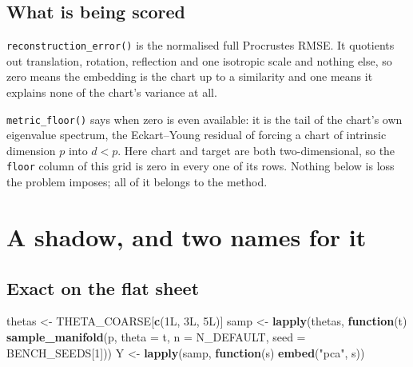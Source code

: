 \documentclass[
  british,
  a4paper,
]{book}
\newenvironment{Shaded}{\begin{snugshade}}{\end{snugshade}}
\newcommand{\AttributeTok}[1]{\textcolor[rgb]{0.13,0.29,0.53}{#1}}
\newcommand{\ControlFlowTok}[1]{\textcolor[rgb]{0.13,0.29,0.53}{\textbf{#1}}}
\newcommand{\DataTypeTok}[1]{\textcolor[rgb]{0.13,0.29,0.53}{#1}}
\newcommand{\DecValTok}[1]{\textcolor[rgb]{0.00,0.00,0.81}{#1}}
\newcommand{\FunctionTok}[1]{\textcolor[rgb]{0.13,0.29,0.53}{\textbf{#1}}}
\newcommand{\NormalTok}[1]{#1}
\newcommand{\OtherTok}[1]{\textcolor[rgb]{0.56,0.35,0.01}{#1}}
\newcommand{\StringTok}[1]{\textcolor[rgb]{0.31,0.60,0.02}{#1}}
\newcounter{none} %
\begin{document}
\subsection{What is being scored}\label{what-is-being-scored}

\texttt{reconstruction\_error()} is the normalised full Procrustes RMSE. It quotients out
translation, rotation, reflection and one isotropic scale \citep{gower1975procrustes}
and nothing else, so zero means the embedding is the chart up to a similarity and
one means it explains none of the chart's variance at all.

\texttt{metric\_floor()} says when zero is even available: it is the tail of the chart's
own eigenvalue spectrum, the Eckart--Young residual of forcing a chart of
intrinsic dimension \(p\) into \(d < p\). Here chart and target are both
two-dimensional, so the \texttt{floor} column of this grid is zero in every one of its
rows. Nothing below is loss the problem imposes; all of it belongs to the method.

\section{A shadow, and two names for it}\label{lin-core}

\subsection{Exact on the flat sheet}\label{exact-on-the-flat-sheet}

\begin{Shaded}
\begin{Highlighting}[]
\NormalTok{thetas }\OtherTok{\textless{}{-}}\NormalTok{ THETA\_COARSE[}\FunctionTok{c}\NormalTok{(}\DecValTok{1}\DataTypeTok{L}\NormalTok{, }\DecValTok{3}\DataTypeTok{L}\NormalTok{, }\DecValTok{5}\DataTypeTok{L}\NormalTok{)]}
\NormalTok{samp   }\OtherTok{\textless{}{-}} \FunctionTok{lapply}\NormalTok{(thetas, }\ControlFlowTok{function}\NormalTok{(t)}
  \FunctionTok{sample\_manifold}\NormalTok{(p, }\AttributeTok{theta =}\NormalTok{ t, }\AttributeTok{n =}\NormalTok{ N\_DEFAULT, }\AttributeTok{seed =}\NormalTok{ BENCH\_SEEDS[}\DecValTok{1}\NormalTok{]))}
\NormalTok{Y }\OtherTok{\textless{}{-}} \FunctionTok{lapply}\NormalTok{(samp, }\ControlFlowTok{function}\NormalTok{(s) }\FunctionTok{embed}\NormalTok{(}\StringTok{"pca"}\NormalTok{, s))}
\end{Highlighting}
\end{Shaded}
\end{document}

